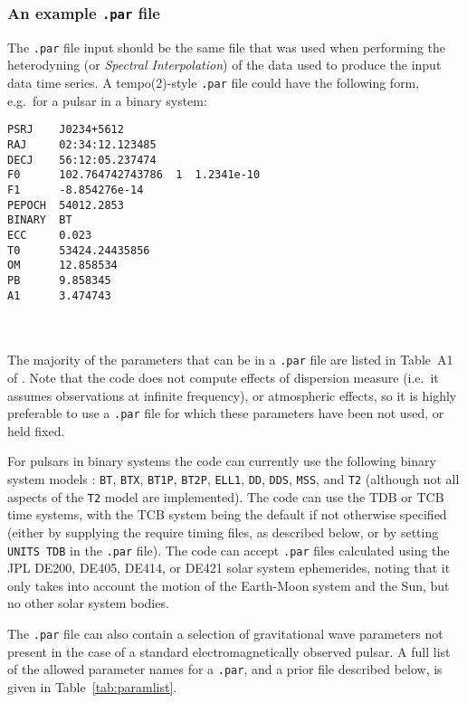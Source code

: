 \subsubsection{An example {\tt .par} file}

The {\tt .par} file input should be the same file that was used when performing the heterodyning (or {\it Spectral Interpolation})
of the data used to produce the input data time series. A {\sc tempo(2)}-style {\tt .par} file could have the following form, e.g.\
for a pulsar in a binary system:
\newsavebox{\Lst}
\begin{lrbox}{\Lst}
\begin{lstlisting}
PSRJ    J0234+5612
RAJ     02:34:12.123485
DECJ    56:12:05.237474
F0      102.764742743786  1  1.2341e-10
F1      -8.854276e-14
PEPOCH  54012.2853
BINARY  BT
ECC     0.023
T0      53424.24435856
OM      12.858534
PB      9.858345
A1      3.474743
\end{lstlisting}
\end{lrbox}
\\[5pt] \indent \fbox{\usebox{\Lst}} \\[5pt]

The majority of the parameters that can be in a {\tt .par} file are listed in Table~A1 of \citep{2006MNRAS.372.1549E}.
Note that the code does not compute effects of dispersion measure (i.e.\ it assumes observations at infinite frequency),
or atmospheric effects, so it is highly preferable to use a {\tt .par} file for which these parameters have been not
used, or held fixed.

For pulsars in binary systems the code can currently use the following binary system models \citep[see e.g.][for discussion
of some of the models]{1989ApJ...345..434T,2007PhRvD..76d2006P}: {\tt BT}, {\tt BTX},
{\tt BT1P}, {\tt BT2P}, {\tt ELL1}, {\tt DD}, {\tt DDS}, {\tt MSS}, and {\tt T2} (although not all aspects of the
{\tt T2} model are implemented). The code can use the TDB or TCB time systems, with the TCB system being the default if not otherwise
specified (either by supplying the require timing files, as described below, or by setting {\tt UNITS TDB} in the {\tt .par} file).
The code can accept {\tt .par} files calculated using the JPL DE200, DE405, DE414, or DE421 solar system ephemerides, noting
that it only takes into account the motion of the Earth-Moon system and the Sun, but no other solar system bodies.

The {\tt .par} file can also contain a selection of gravitational wave parameters not present in the case of a standard
electromagnetically observed pulsar. A full list of the allowed parameter names for a {\tt .par}, and a prior file described below,
is given in Table~\ref{tab:paramlist}.

